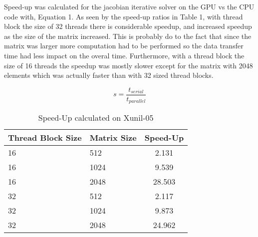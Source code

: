 \documentclass[12pt]{article}
\begin{document}
\qquad Speed-up was calculated for the jacobian iterative solver on the GPU
vs the CPU code with, Equation 1. 
As seen by the speed-up ratios in Table 1, with thread block the size of 32 threads there is
considerable speedup, and increased speedup as the size of the matrix
increased. This is probably do to the fact that since the matrix was larger
more computation had to be performed so the data transfer time had less impact on
the overal time. Furthermore, with a thread block the size of 16 threads the
speedup was mostly slower except for the matrix with 2048 elements which was
actually faster than with 32 sized thread blocks. 

\begin{equation}
    s = \frac{t_{serial}}{t_{parallel}}\label{eq1}
\end{equation}

\begin{table}[H]
\centering
\begin{tabular}{@{}|l|l|c|}
\hline
Thread Block Size & Matrix Size & Speed-Up \\ \hline
16 & 512 & 2.131  \\ \hline
16 & 1024 &  9.539 \\ \hline
16 & 2048 &  28.503 \\ \hline
32 & 512 & 2.117  \\ \hline
32 & 1024 & 9.873  \\ \hline
32 & 2048 & 24.962  \\ \hline
\end{tabular}
\caption{Speed-Up calculated on Xunil-05}
\end{table}
\end{document}
